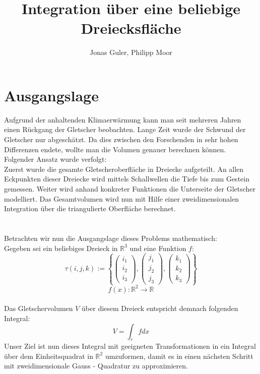 \documentclass[12pt]{article}
\begin{document}
\title{Integration über eine beliebige Dreiecksfläche}
\author{Jonas Guler, Philipp Moor}
\maketitle
\pagestyle{scrheadings}
\clearscrheadfoot
{}
\ofoot{\pagemark}

\newpage
%
%

\section{Ausgangslage}
Aufgrund der anhaltenden Klimaerwärmung kann man seit mehreren Jahren einen Rückgang der Gletscher beobachten. Lange Zeit wurde der Schwund der Gletscher nur abgeschätzt. Da dies zwischen den Forschenden in sehr hohen Differenzen endete, wollte man die Volumen genauer berechnen können. Folgender Ansatz wurde verfolgt:\\
Zuerst wurde die gesamte Gletscheroberfläche in Dreiecke aufgeteilt. An allen Eckpunkten dieser Dreiecke wird mittels Schallwellen die Tiefe bis zum Gestein gemessen. Weiter wird anhand konkreter Funktionen die Unterseite der Gletscher modelliert. Das Gesamtvolumen wird nun mit Hilfe einer zweidimensionalen Integration über die triangulierte Oberfläche berechnet. \\ \\ \\
Betrachten wir nun die Ausgangslage dieses Problems mathematisch: \\
Gegeben sei ein beliebiges Dreieck in $\mathbb{R}^3$ und eine Funktion $f$:
\[
\tau(i,j,k) :=
\left \{
		 \begin{pmatrix} i_1\\ i_2 \\ i_3 \end{pmatrix}
		 ,
		 \begin{pmatrix} j_1\\ j_2 \\ j_3 \end{pmatrix}
		 ,
		 \begin{pmatrix} k_1\\ k_2 \\ k_3 \end{pmatrix}
\right \}
\]
\[
   f(x) : \mathbb{R}^2 \rightarrow \mathbb{R}
\]
\\
Das Gletschervolumen $V$ über diesem Dreieck entspricht demnach folgenden Integral:
\[
V=\int_{\tau}fdx
\]
Unser Ziel ist nun dieses Integral mit geeigneten Transformationen in ein Integral über dem Einheitsquadrat in $\mathbb{R}^2$ umzuformen, damit es in einen nächsten Schritt mit zweidimensionale Gauss - Quadratur zu approximieren. \\
\\
\end{document}
